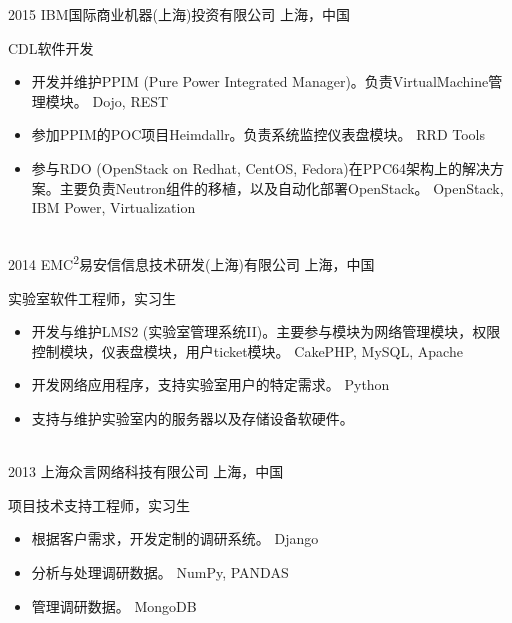 \documentclass[]{friggeri-cv-cn} %
\begin{document}
\begin{entrylist}
	\entry
	{2015}
	{IBM国际商业机器(上海)投资有限公司}
	{上海，中国}
	{CDL软件开发
		\begin{itemize}
			\item 开发并维护PPIM (Pure Power Integrated Manager)。负责VirtualMachine管理模块。{\footnotesize{} Dojo, REST}
			\item 参加PPIM的POC项目Heimdallr。负责系统监控仪表盘模块。{\footnotesize{} RRD Tools}
			\item 参与RDO (OpenStack on Redhat, CentOS, Fedora)在PPC64架构上的解决方案。主要负责Neutron组件的移植，以及自动化部署OpenStack。{\footnotesize{} OpenStack, IBM Power, Virtualization}
		\end{itemize}
	}
\\
	\entry
	{2014}
	{EMC\textsuperscript{2}易安信信息技术研发(上海)有限公司}
	{上海，中国}
	{实验室软件工程师，实习生
		\begin{itemize}
			\item 开发与维护LMS2 (实验室管理系统II)。主要参与模块为网络管理模块，权限控制模块，仪表盘模块，用户ticket模块。 {\footnotesize{} CakePHP, MySQL, Apache}
			\item 开发网络应用程序，支持实验室用户的特定需求。{\footnotesize{} Python}
			\item 支持与维护实验室内的服务器以及存储设备软硬件。
		\end{itemize}
	}
\\
	\entry
	{2013}
	{上海众言网络科技有限公司}
	{上海，中国}
	{项目技术支持工程师，实习生
		\begin{itemize}
			\item 根据客户需求，开发定制的调研系统。{\footnotesize{} Django}
			\item 分析与处理调研数据。{\footnotesize{} NumPy, PANDAS}
			\item 管理调研数据。{\footnotesize{} MongoDB}
		\end{itemize}
	}
\end{entrylist}
\end{document}
